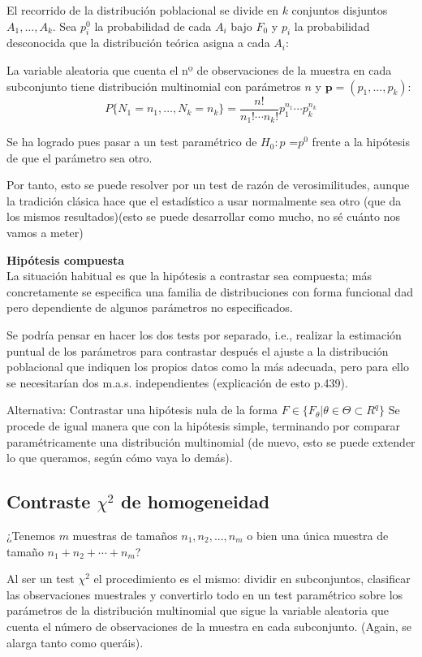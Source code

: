 \documentclass[a4paper,12pt]{article}
\begin{document}
El recorrido de la distribución poblacional se divide en $k$ conjuntos disjuntos $A_1,...,A_k$. Sea $p^0_i$ la probabilidad de cada $A_i$ bajo $F_0$ y $p_i$ la probabilidad desconocida que la distribución teórica asigna a cada $A_i$:

La variable aleatoria que cuenta el nº de observaciones de la muestra en cada subconjunto tiene distribución multinomial con parámetros $n$ y $\textbf{p}= (p_1,...,p_k)$:
$$P\{N_1=n_1,...,N_k=n_k\}= \frac{n!}{n_1!\cdots n_k!} p^{n_1}_1\cdots p^{n_k}_k$$

Se ha logrado pues pasar a un test paramétrico de $H_0: $\textbf{$p$} =\textbf{$p^0$} frente a la hipótesis de que el parámetro sea otro.

Por tanto, esto se puede resolver por un test de razón de verosimilitudes, aunque la tradición clásica hace que el estadístico a usar normalmente sea otro (que da los mismos resultados)(esto se puede desarrollar como mucho, no sé cuánto nos vamos a meter)

\textbf{Hipótesis compuesta} \\
La situación habitual es que la hipótesis a contrastar sea compuesta; más concretamente se especifica una familia de distribuciones con forma funcional dad pero dependiente de algunos parámetros no especificados.

Se podría pensar en hacer los dos tests por separado, i.e., realizar la estimación puntual de los parámetros para contrastar después el ajuste a la distribución poblacional que indiquen los propios datos como la más adecuada, pero para ello se necesitarían dos m.a.s. independientes (explicación de esto p.439).

Alternativa: Contrastar una hipótesis nula de la forma $F \in \{F_\theta| \theta \in \Theta \subset R^q\}$
Se procede de igual manera que con la hipótesis simple, terminando por comparar paramétricamente una distribución multinomial (de nuevo, esto se puede extender lo que queramos, según cómo vaya lo demás).

\subsection{Contraste $\chi^2$ de homogeneidad}
¿Tenemos $m$ muestras de tamaños $n_1, n_2,...,n_m$ o bien una única muestra de tamaño $n_1+n_2+\cdots + n_m$?

Al ser un test $\chi ^2$ el procedimiento es el mismo: dividir en subconjuntos, clasificar las observaciones muestrales y convertirlo todo en un test paramétrico sobre los parámetros de la distribución multinomial que sigue la variable aleatoria que cuenta el número de observaciones de la muestra en cada subconjunto. (Again, se alarga tanto como queráis).
\end{document}
